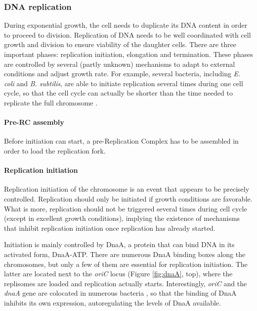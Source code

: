 \subsubsection{DNA replication}

During exponential growth, the cell needs to duplicate its DNA content in order to proceed to division. Replication of DNA needs to be well coordinated with cell growth and division to ensure viability of the daughter cells. There are three important phases: replication initiation, elongation and termination. These phases are controlled by several (partly unknown) mechanisms to adapt to external conditions and adjust growth rate. For example, several bacteria, including \textit{E. coli} and \textit{B. subtilis}, are able to initiate replication several times during one cell cycle, so that the cell cycle can actually be shorter than the time needed to replicate the full chromosome \citep{reyes-lamothe_chromosome_2012}.

\paragraph{Pre-RC assembly} Before initiation can start, a pre-Replication Complex has to be assembled in order to load the replication fork.

\paragraph{Replication initiation} Replication initiation of the chromosome is an event that appears to be precisely controlled. Replication should only be initiated if growth conditions are favorable. What is more, replication should not be triggered several times during cell cycle (except in excellent growth conditions), implying the existence of mechanisms that inhibit replication initiation once replication has already started.

Initiation is mainly controlled by DnaA, a protein that can bind DNA in its activated form, DnaA-ATP. There are numerous DnaA binding boxes along the chromosomes, but only a few of them are essential for replication initiation. The latter are located next to the \textit{oriC} locus (Figure \ref{fig:dnaA}, top), where the replisomes are loaded and replication actually starts. Interestingly, \textit{oriC} and the \textit{dnaA} gene are colocated in numerous bacteria \citep{briggs_chromosomal_2012}, so that the binding of DnaA inhibits its own expression, autoregulating the levels of DnaA available.

